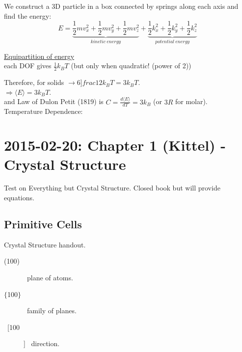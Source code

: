 \documentclass[english, 11pt]{article}
\begin{document}
		We construct a 3D particle in a box connected by springs along each axis and find the energy:
		\begin{equation*}
			E = \underbrace{\frac{1}{2} m v_x^2 + \frac{1}{2} m v_y^2 + \frac{1}{2} m v_z^2}_{kinetic\ energy} +
				\underbrace{\frac{1}{2} k_x^2 + \frac{1}{2} k_y^2 + \frac{1}{2} k_z^2}_{potential\ energy}
		\end{equation*}

		\underline{Equipartition of energy}\\
			each DOF gives $\frac{1}{2} k_B T$  (but only when quadratic!  (power of 2))
		
		Therefore, for solids $\rightarrow 6 ]frac{1}{2} k_B T = 3 k_B T$. \\
		$\Rightarrow \langle E\rangle = 3 k_B T$. \\
		and Law of Dulon Petit (1819) is $C = \frac{d \langle E\rangle}{dT} = 3k_B$ (or $3R$ for molar).\\
		
		Temperature Dependence:

	\pagebreak
	


	\section{2015-02-20: Chapter 1 (Kittel) - Crystal Structure}
		Test on Everything but Crystal Structure.
		Closed book but will provide equations.
		\subsection{Primitive Cells}
			Crystal Structure handout.
			\begin{description}
				\item[(100)]  \ 
					plane of atoms.
				\item[$\{$100$\}$] \
					family of planes.
				\item[\ [100] ] \
					direction.
			\end{description}
\end{document}
